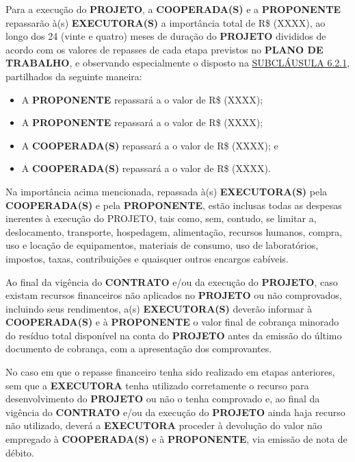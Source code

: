 
\xx Para a execução do \textbf{PROJETO}, a \textbf{COOPERADA(S)} e a \textbf{PROPONENTE} repassarão à(s) \textbf{EXECUTORA(S)} a importância total de R\$ {\ValorContrato} (XXXX), ao longo dos 24 (vinte e quatro) meses de duração do \textbf{PROJETO} divididos de acordo com os valores de repasses de cada etapa previstos no \textbf{PLANO DE TRABALHO}, e observando especialmente o disposto na \hyperlink{6.2.1}{SUBCLÁUSULA 6.2.1}, partilhados da seguinte maneira:

\begin{itemize}[leftmargin=1cm]
    \item A \textbf{PROPONENTE} repassará a \NomeExecutoraA o valor de R\$ \RepasseProponenteExecutoraA (XXXX);
    \item A \textbf{PROPONENTE} repassará a \NomeExecutoraB o valor de R\$ \RepasseProponenteExecutoraB (XXXX);
    \item A \textbf{COOPERADA(S)} repassará a \NomeExecutoraA o valor de R\$ \RepasseCooperadaExecutoraA (XXXX); e
    \item A \textbf{COOPERADA(S)} repassará a \NomeExecutoraB o valor de R\$ \RepasseCooperadaExecutoraB (XXXX).
\end{itemize}

\xx Na importância acima mencionada, repassada à(s) \textbf{EXECUTORA(S)} pela \textbf{COOPERADA(S)} e pela \textbf{PROPONENTE}, estão inclusas todas as despesas inerentes à execução do PROJETO, tais como, sem, contudo, se limitar a, deslocamento, transporte, hospedagem, alimentação, recursos humanos, compra, uso e locação de equipamentos, materiais de consumo, uso de laboratórios, impostos, taxas, contribuições e quaisquer outros encargos cabíveis.

\xx Ao final da vigência do \textbf{CONTRATO} e/ou da execução do \textbf{PROJETO}, caso existam recursos financeiros não aplicados no \textbf{PROJETO} ou não comprovados, incluindo seus rendimentos, a(s) \textbf{EXECUTORA(S)} deverão informar à \textbf{COOPERADA(S)} e à \textbf{PROPONENTE} o valor final de cobrança minorado do resíduo total disponível na conta do \textbf{PROJETO} antes da emissão do último documento de cobrança, com a apresentação dos comprovantes.

\xxx No caso em que o repasse financeiro tenha sido realizado em etapas anteriores, sem que a \textbf{EXECUTORA} tenha utilizado corretamente o recurso para desenvolvimento do \textbf{PROJETO} ou não o tenha comprovado e, ao final da vigência do \textbf{CONTRATO} e/ou da execução do \textbf{PROJETO} ainda haja recurso não utilizado, deverá a \textbf{EXECUTORA} proceder à devolução do valor não empregado à \textbf{COOPERADA(S)} e à \textbf{PROPONENTE}, via emissão de nota de débito.
